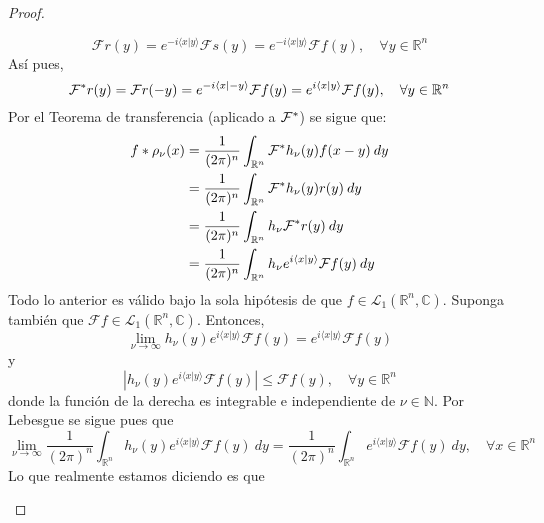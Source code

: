 \documentclass[12pt]{report}
\newcounter{it}
\theoremstyle{largebreak}
\renewcommand{\leq}{\ensuremath{\leqslant}}
\newcommand\abs[1]{\ensuremath{\left|#1\right|}}
\newcommand\pint[2]{\ensuremath{\langle#1| #2\rangle}}
\newcommand{\fou}[1]{\ensuremath{\mathcal{F}#1}}
\begin{document}
\begin{proof}
\begin{enumerate}
\begin{equation*}
                \fou{r}(y)=e^{ -i\pint{x}{y}}\fou{s}(y)=e^{ -i\pint{x}{y}}\fou{f}(y),\quad\forall y\in\mathbb{R}^n
            \end{equation*}
            Así pues,
            \begin{equation*}
                \fou^*{r}(y)=\fou{r}(-y)=e^{-i\pint{x}{-y}}\fou{f}(y)=e^{ i\pint{x}{y}}\fou{f}(y),\quad\forall y\in\mathbb{R}^n
            \end{equation*}
            Por el Teorema de transferencia (aplicado a $\fou^*{}$) se sigue que:
            \begin{equation*}
                \begin{split}
                    f*\rho_\nu(x)&=\frac{1}{(2\pi)^n}\int_{\mathbb{R}^n}\fou^*{h_\nu}(y)f(x-y)\:dy\\
                    &=\frac{1}{(2\pi)^n}\int_{\mathbb{R}^n}\fou^*{h_\nu}(y)r(y)\:dy\\
                    &=\frac{1}{(2\pi)^n}\int_{\mathbb{R}^n}h_\nu\fou^*{r}(y)\:dy\\
                    &=\frac{1}{(2\pi)^n}\int_{\mathbb{R}^n}h_\nu e^{i\pint{x}{y}}\fou{f}(y)\:dy\\
                \end{split}
            \end{equation*}
            Todo lo anterior es válido bajo la sola hipótesis de que $f\in\mathcal{L}_1(\mathbb{R}^n,\mathbb{C})$. Suponga también que $\fou{f}\in\mathcal{L}_1(\mathbb{R}^n,\mathbb{C})$. Entonces,
            \begin{equation*}
                \lim_{ \nu\rightarrow\infty}h_\nu(y)e^{ i\pint{x}{y}}\fou{f}(y)=e^{ i\pint{x}{y}}\fou{f}(y)
            \end{equation*}
            y
            \begin{equation*}
                \abs{h_\nu(y)e^{ i\pint{x}{y}}\fou{f}(y)}\leq\fou{f}(y),\quad\forall y\in\mathbb{R}^n
            \end{equation*}
            donde la función de la derecha es integrable e independiente de $\nu\in\mathbb{N}$. Por Lebesgue se sigue pues que
            \begin{equation*}
                \lim_{ \nu\rightarrow\infty}\frac{1}{(2\pi)^n}\int_{\mathbb{R}^n}h_\nu(y)e^{ i\pint{x}{y}}\fou{f}(y)\:dy=\frac{1}{(2\pi)^n}\int_{\mathbb{R}^n}e^{ i\pint{x}{y}}\fou{f}(y)\:dy,\quad\forall x\in\mathbb{R}^n
            \end{equation*}
            Lo que realmente estamos diciendo es que
            \begin{equation*}

\end{equation*}
\end{enumerate}
\end{proof}
\end{document}
